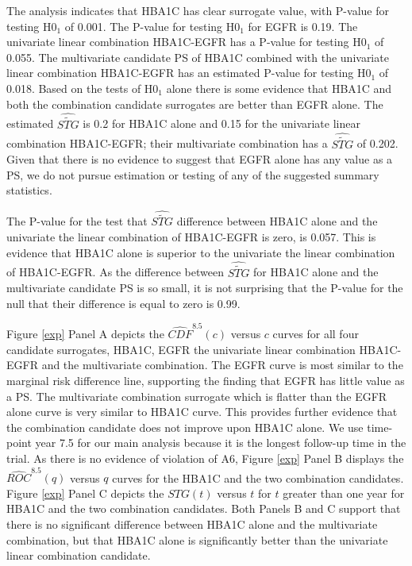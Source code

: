\documentclass[times, doublespace]{simauth}
\begin{document}
The analysis indicates that HBA1C has clear surrogate value, with P-value for testing H0$_1$ of 0.001. The P-value for testing H0$_1$ for EGFR is 0.19. The univariate linear combination HBA1C-EGFR has a P-value for testing H0$_1$ of 0.055. The multivariate candidate PS of HBA1C combined with the univariate linear combination HBA1C-EGFR has an estimated P-value for testing H0$_1$ of 0.018. Based on the tests of H0$_1$ alone there is some evidence that HBA1C and both the combination candidate surrogates are better than EGFR alone. The estimated $\widehat{\widetilde{STG}}$ is 0.2 for HBA1C alone and 0.15 for the univariate linear combination HBA1C-EGFR; their multivariate combination has a $\widehat{\widetilde{STG}}$ of 0.202. Given that there is no evidence to suggest that EGFR alone has any value as a PS, we do not pursue estimation or testing of any of the suggested summary statistics.

The P-value for the test that $\widehat{\widetilde{STG}}$ difference between HBA1C alone and the univariate the linear combination of HBA1C-EGFR is zero, is 0.057. This is evidence that HBA1C alone is superior to the univariate the linear combination of HBA1C-EGFR. As the difference between $\widehat{\widetilde{STG}}$ for HBA1C alone and the multivariate candidate PS is so small, it is not surprising that the P-value for the null that their difference is equal to zero is 0.99. 

Figure \ref{exp} Panel A depicts the $\widehat{CDF}^{8.5}(c)$ versus $c$ curves for all four candidate surrogates, HBA1C, EGFR the univariate linear combination HBA1C-EGFR and the multivariate combination. The EGFR curve is most similar to the marginal risk difference line, supporting the finding that EGFR has little value as a PS. The multivariate combination surrogate which is flatter than the EGFR alone curve is very similar to HBA1C curve. This provides further evidence that the combination candidate does not improve upon HBA1C alone. We use time-point year 7.5 for our main analysis because it is the longest follow-up time in the trial. As there is no evidence of violation of A6, Figure \ref{exp} Panel B displays the $\widehat{ROC}^{8.5}(q)$ versus $q$ curves for the HBA1C and the two combination candidates. Figure \ref{exp} Panel C depicts the $STG(t)$ versus $t$ for $t$ greater than one year for HBA1C and the two combination candidates. Both Panels B and C support that there is no significant difference between HBA1C alone and the multivariate combination, but that HBA1C alone is significantly better than the univariate linear combination candidate.
\end{document}
